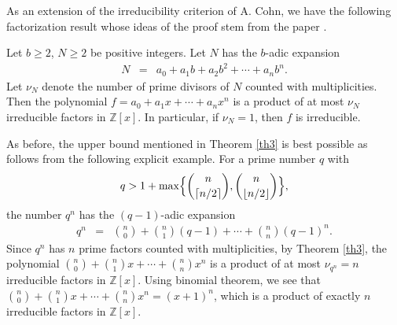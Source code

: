 \documentclass[12pt,reqno]{amsart}%
\begin{document}
As an extension of the irreducibility criterion of A. Cohn, we have the following factorization result whose ideas of the proof stem from the paper \cite{Mu}.
\begin{theorem}\label{th3}
    Let $b\geq 2$, $N\geq 2$ be positive integers. Let $N$ has the  $b$-adic expansion
    \begin{eqnarray*}
      N &=& a_0+a_1 b+a_2 b^2+\cdots+a_n b^n.
    \end{eqnarray*}
Let $\nu_N$ denote the number of prime divisors of $N$ counted with multiplicities. Then the polynomial $f=a_0+a_1 x+\cdots+a_n x^n$ is a product of at most $\nu_N$ irreducible factors in $\mathbb{Z}[x]$. In particular, if $\nu_N=1$, then $f$ is irreducible.
\end{theorem}
As before, the upper bound mentioned in Theorem \ref{th3} is best possible as follows from the following explicit example.
For a prime number  $q$ with
\begin{eqnarray*}
q>1+ \max\Bigl\{{n\choose \lceil n/2\rceil},{n\choose \lfloor n/2\rfloor}\Bigr\},
\end{eqnarray*}
the number $q^n$ has the $(q-1)$-adic expansion
\begin{eqnarray*}
q^n &=& {n\choose 0}+{n\choose 1}(q-1)+\cdots+{n\choose n}(q-1)^n.
\end{eqnarray*}
Since $q^n$ has $n$ prime factors counted with multiplicities, by Theorem \ref{th3}, the polynomial
${n\choose 0}+{n\choose 1}x+\cdots+{n\choose n}x^n$
is a product of at most $\nu_{q^n}=n$ irreducible factors in $\mathbb{Z}[x]$. Using binomial theorem, we see that ${n\choose 0}+{n\choose 1}x+\cdots+{n\choose n}x^n =(x+1)^n$, which is  a product of exactly $n$ irreducible factors in $\mathbb{Z}[x]$.
\end{document}
